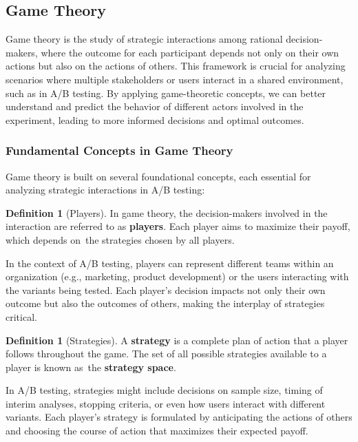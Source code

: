 \documentclass[magisterska, english]{pwr_wmat_praca_dyplomowa}
\theoremstyle{plain}
\numberwithin{theorem}{chapter}
\theoremstyle{definition}
\numberwithin{theorem}{chapter}
\newtheorem{definition}[theorem]{Definition}
\begin{document}
\subsection{Game Theory}

Game theory is the study of strategic interactions among rational decision-makers, where the outcome for each participant depends not only on their own actions but also on the actions of others. This framework is crucial for analyzing scenarios where multiple stakeholders or users interact in a shared environment, such as in A/B testing. By applying game-theoretic concepts, we can better understand and predict the behavior of different actors involved in the experiment, leading to more informed decisions and optimal outcomes.

\subsubsection{Fundamental Concepts in Game Theory}

Game theory is built on several foundational concepts, each essential for analyzing strategic interactions in A/B testing:

\begin{definition}[Players]
	In game theory, the decision-makers involved in the interaction are referred to as \textbf{players}. Each player aims to maximize their payoff, which depends on~the strategies chosen by all players. 
\end{definition}
\noindent
In the context of A/B testing, players can represent different teams within an organization (e.g., marketing, product development) or the users interacting with the variants being tested. Each player’s decision impacts not only their own outcome but also the outcomes of others, making the interplay of strategies critical.

\begin{definition}[Strategies]
	A \textbf{strategy} is a complete plan of action that a player follows throughout the game. The set of all possible strategies available to a player is known as~the \textbf{strategy space}.
\end{definition}
\noindent
In A/B testing, strategies might include decisions on sample size, timing of interim analyses, stopping criteria, or even how users interact with different variants. Each player’s strategy is formulated by anticipating the actions of others and choosing the course of action that maximizes their expected payoff.
\end{document}
